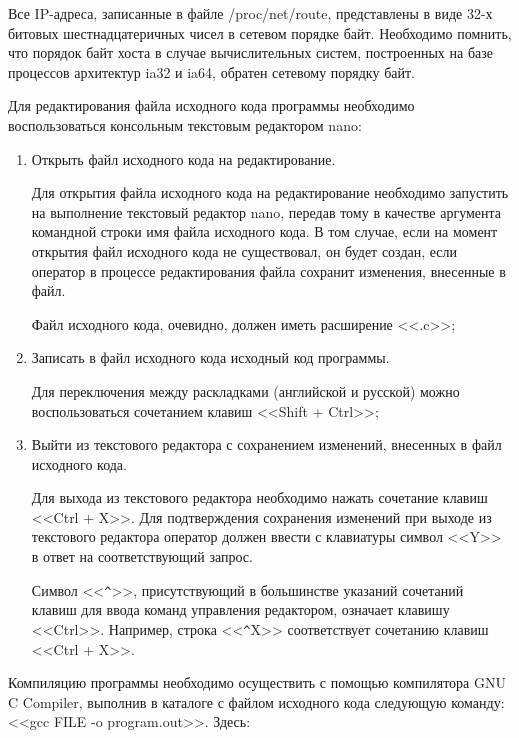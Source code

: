 	Все IP-адреса, записанные в файле /proc/net/route, представлены в виде 32-х битовых шестнадцатеричных чисел в сетевом порядке байт.
	Необходимо помнить, что порядок байт хоста в случае вычислительных систем, построенных на базе процессов архитектур ia32 и ia64,
	обратен сетевому порядку байт.

	Для редактирования файла исходного кода программы необходимо воспользоваться консольным текстовым редактором nano:

	\begin{enumerate}

		\item Открыть файл исходного кода на редактирование.
		
		Для открытия файла исходного кода на редактирование необходимо запустить на выполнение текстовый редактор nano,
		передав тому в качестве аргумента командной строки имя файла исходного кода. В том случае, если на момент открытия файл исходного кода не существовал,
		он будет создан, если оператор в процессе редактирования файла сохранит изменения, внесенные в файл.

		Файл исходного кода, очевидно, должен иметь расширение <<.c>>;

		\item Записать в файл исходного кода исходный код программы.

		Для переключения между раскладками (английской и русской) можно воспользоваться сочетанием клавиш <<Shift + Ctrl>>;

		\item Выйти из текстового редактора с сохранением изменений, внесенных в файл исходного кода.

		Для выхода из текстового редактора необходимо нажать сочетание клавиш <<Ctrl + X>>.
		Для подтверждения сохранения изменений при выходе из текстового редактора оператор должен ввести с
		клавиатуры символ <<Y>> в ответ на соответствующий запрос.
		
		Символ <<\verb|^|>>, присутствующий в большинстве указаний сочетаний клавиш для ввода команд управления редактором, означает клавишу <<Ctrl>>.
		Например, строка <<\verb|^|X>> соответствует сочетанию клавиш <<Ctrl + X>>.

	\end{enumerate}

	Компиляцию программы необходимо осуществить с помощью компилятора GNU C Compiler, выполнив в каталоге с файлом исходного кода следующую команду:
	<<gcc FILE -o program.out>>. Здесь:

